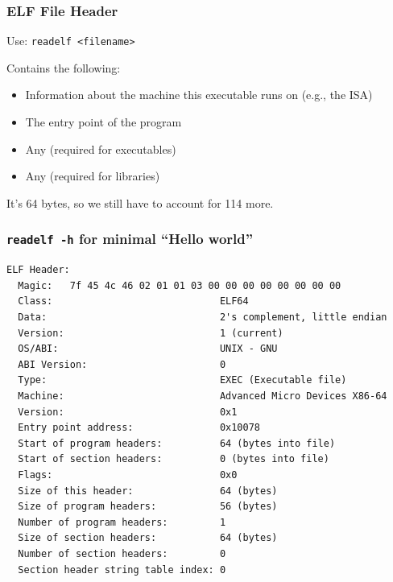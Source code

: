 \documentclass[aspectratio=169]{beamer}
\begin{document}
  \begin{frame}
    \frametitle{ELF File Header}

    Use: \hspace{0.5em} \texttt{readelf <filename>}

    \vspace{1em}

    Contains the following:
    \begin{itemize}
      \item Information about the machine this executable runs on (e.g., the
            ISA)
      \item The entry point of the program
      \item Any  (required for executables)
      \item Any  (required for libraries)
    \end{itemize}

    \vspace{2em}

    It's 64 bytes, so we still have to account for 114 more.
  \end{frame}

  \begin{frame}[fragile]
    \frametitle{\texttt{readelf -h} for minimal ``Hello world''}

    \begin{lstlisting}[basicstyle=\scriptsize\ttfamily]
ELF Header:
  Magic:   7f 45 4c 46 02 01 01 03 00 00 00 00 00 00 00 00 
  Class:                             ELF64
  Data:                              2's complement, little endian
  Version:                           1 (current)
  OS/ABI:                            UNIX - GNU
  ABI Version:                       0
  Type:                              EXEC (Executable file)
  Machine:                           Advanced Micro Devices X86-64
  Version:                           0x1
  Entry point address:               0x10078
  Start of program headers:          64 (bytes into file)
  Start of section headers:          0 (bytes into file)
  Flags:                             0x0
  Size of this header:               64 (bytes)
  Size of program headers:           56 (bytes)
  Number of program headers:         1
  Size of section headers:           64 (bytes)
  Number of section headers:         0
  Section header string table index: 0
    \end{lstlisting}
  \end{frame}
\end{document}
